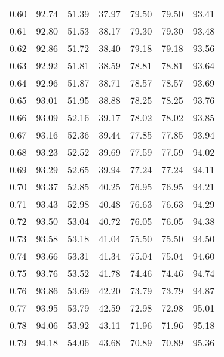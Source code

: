 \begin{tabular}{|c|c|c|c|c|c|c|}
      0.60 &     92.74 &     51.39 &      37.97 &   79.50 &      79.50 &         93.41 \\
      0.61 &     92.80 &     51.53 &      38.17 &   79.30 &      79.30 &         93.48 \\
      0.62 &     92.86 &     51.72 &      38.40 &   79.18 &      79.18 &         93.56 \\
      0.63 &     92.92 &     51.81 &      38.59 &   78.81 &      78.81 &         93.64 \\
      0.64 &     92.96 &     51.87 &      38.71 &   78.57 &      78.57 &         93.69 \\
      0.65 &     93.01 &     51.95 &      38.88 &   78.25 &      78.25 &         93.76 \\
      0.66 &     93.09 &     52.16 &      39.17 &   78.02 &      78.02 &         93.85 \\
      0.67 &     93.16 &     52.36 &      39.44 &   77.85 &      77.85 &         93.94 \\
      0.68 &     93.23 &     52.52 &      39.69 &   77.59 &      77.59 &         94.02 \\
      0.69 &     93.29 &     52.65 &      39.94 &   77.24 &      77.24 &         94.11 \\
      0.70 &     93.37 &     52.85 &      40.25 &   76.95 &      76.95 &         94.21 \\
      0.71 &     93.43 &     52.98 &      40.48 &   76.63 &      76.63 &         94.29 \\
      0.72 &     93.50 &     53.04 &      40.72 &   76.05 &      76.05 &         94.38 \\
      0.73 &     93.58 &     53.18 &      41.04 &   75.50 &      75.50 &         94.50 \\
      0.74 &     93.66 &     53.31 &      41.34 &   75.04 &      75.04 &         94.60 \\
      0.75 &     93.76 &     53.52 &      41.78 &   74.46 &      74.46 &         94.74 \\
      0.76 &     93.86 &     53.69 &      42.20 &   73.79 &      73.79 &         94.87 \\
      0.77 &     93.95 &     53.79 &      42.59 &   72.98 &      72.98 &         95.01 \\
      0.78 &     94.06 &     53.92 &      43.11 &   71.96 &      71.96 &         95.18 \\
      0.79 &     94.18 &     54.06 &      43.68 &   70.89 &      70.89 &         95.36 \\

\end{tabular}
